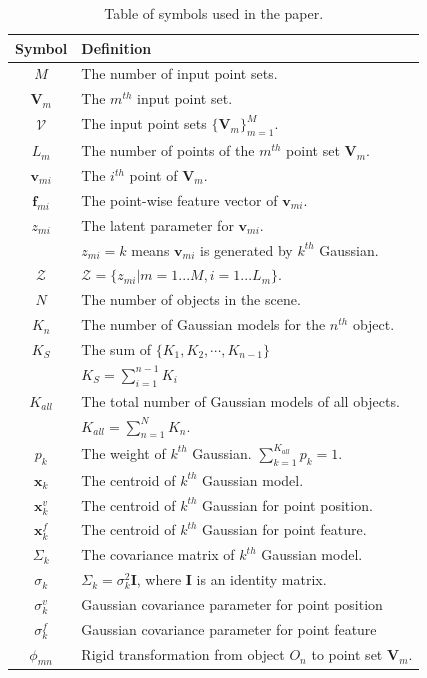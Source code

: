 \begin{table}[!hbp]
\centering
\caption{Table of symbols used in the paper.} 
\label{tab:symbol}
\begin{tabular}{c|l}
\hline
Symbol         & Definition\\
\hline
$M$            & The number of input point sets.\\
$\mathbf{V}_m$ & The $m^{th}$ input point set.\\
$\mathcal{V}$  & The input point sets $\{\mathbf{V}_m\}^{M}_{m=1}$.\\
$L_m$          & The number of points of the $m^{th}$ point set $\mathbf{V}_m$.\\
$\mathbf{v}_{mi}$ & The $i^{th}$ point of $\mathbf{V}_m$.\\
$\mathbf f_{mi}$   & The point-wise feature vector of $\mathbf v_{mi}$.\\
$z_{mi}$       & The latent parameter for $\mathbf v_{mi}$.\\
               & $z_{mi}=k$ means $\mathbf{v}_{mi}$ is generated by $k^{th}$ Gaussian. \\
$\mathcal{Z}$            & $\mathcal{Z}=\{z_{mi}|m=1...M,i=1...L_m\}$.\\
$N$            & The number of objects in the scene.\\
$K_n$          & The number of Gaussian models for the $n^{th}$ object. \\
$K_S$		   & The sum of $\{K_1,K_2,\cdots,K_{n-1}\}$\\
			   & $K_S = \sum_{i=1}^{n-1}K_i$\\
$K_{all}$      & The total number of Gaussian models of all objects. \\
               & $K_{all} = \sum_{n=1}^N K_n $.\\
$p_k$          & The weight of $k^{th}$ Gaussian. $\sum_{k=1}^{K_{all}}p_k=1$.\\
$\mathbf x_k$     & The centroid of $k^{th}$ Gaussian model.\\
$\mathbf {x}^{v}_k$   & The centroid of $k^{th}$ Gaussian for point position.\\
$\mathbf {x}^{f}_k$   & The centroid of $k^{th}$ Gaussian for point feature.\\
$\Sigma_k$     & The covariance matrix of $k^{th}$ Gaussian model.\\
$\sigma_k$     & $\Sigma_k=\sigma_k^2\mathbf{I}$, where $\mathbf{I}$ is an identity matrix.\\
$\sigma^v_k$   & Gaussian covariance parameter for point position\\
$\sigma^f_k$   & Gaussian covariance parameter for point feature\\
$\phi_{mn}$    & Rigid transformation from object $O_n$ to point set $\mathbf{V}_m$.\\
\hline
\end{tabular}
\end{table}
